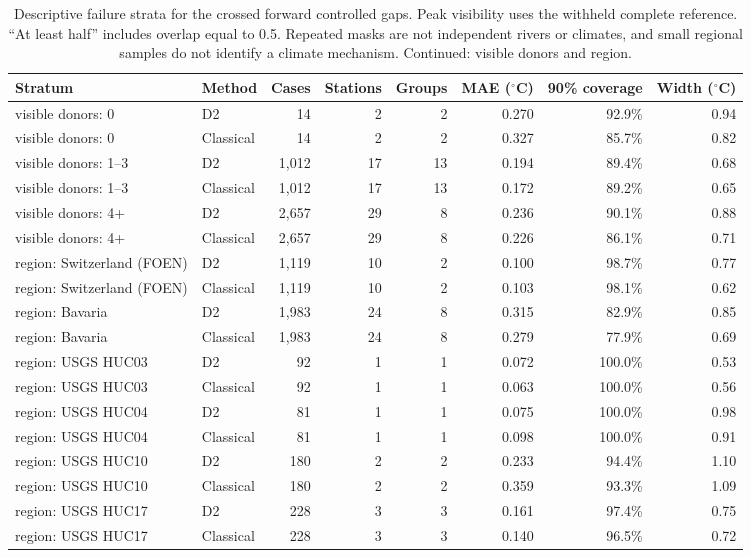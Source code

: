 \begin{table}[p]
\centering
\scriptsize
\setlength{\tabcolsep}{3pt}
\renewcommand{\arraystretch}{0.96}
\caption{Descriptive failure strata for the crossed forward controlled gaps. Peak visibility uses the withheld complete reference. ``At least half'' includes overlap equal to 0.5. Repeated masks are not independent rivers or climates, and small regional samples do not identify a climate mechanism. Continued: visible donors and region.}
\label{tab:failure-strata-region}
\begin{tabular}{@{}llrrrrrr@{}}
\toprule
Stratum & Method & Cases & Stations & Groups & MAE ($^{\circ}$C) & 90\% coverage & Width ($^{\circ}$C) \\
\midrule
visible donors: 0 & D2 & 14 & 2 & 2 & 0.270 & 92.9\% & 0.94 \\
visible donors: 0 & Classical & 14 & 2 & 2 & 0.327 & 85.7\% & 0.82 \\
visible donors: 1--3 & D2 & 1,012 & 17 & 13 & 0.194 & 89.4\% & 0.68 \\
visible donors: 1--3 & Classical & 1,012 & 17 & 13 & 0.172 & 89.2\% & 0.65 \\
visible donors: 4+ & D2 & 2,657 & 29 & 8 & 0.236 & 90.1\% & 0.88 \\
visible donors: 4+ & Classical & 2,657 & 29 & 8 & 0.226 & 86.1\% & 0.71 \\
region: Switzerland (FOEN) & D2 & 1,119 & 10 & 2 & 0.100 & 98.7\% & 0.77 \\
region: Switzerland (FOEN) & Classical & 1,119 & 10 & 2 & 0.103 & 98.1\% & 0.62 \\
region: Bavaria & D2 & 1,983 & 24 & 8 & 0.315 & 82.9\% & 0.85 \\
region: Bavaria & Classical & 1,983 & 24 & 8 & 0.279 & 77.9\% & 0.69 \\
region: USGS HUC03 & D2 & 92 & 1 & 1 & 0.072 & 100.0\% & 0.53 \\
region: USGS HUC03 & Classical & 92 & 1 & 1 & 0.063 & 100.0\% & 0.56 \\
region: USGS HUC04 & D2 & 81 & 1 & 1 & 0.075 & 100.0\% & 0.98 \\
region: USGS HUC04 & Classical & 81 & 1 & 1 & 0.098 & 100.0\% & 0.91 \\
region: USGS HUC10 & D2 & 180 & 2 & 2 & 0.233 & 94.4\% & 1.10 \\
region: USGS HUC10 & Classical & 180 & 2 & 2 & 0.359 & 93.3\% & 1.09 \\
region: USGS HUC17 & D2 & 228 & 3 & 3 & 0.161 & 97.4\% & 0.75 \\
region: USGS HUC17 & Classical & 228 & 3 & 3 & 0.140 & 96.5\% & 0.72 \\
\bottomrule
\end{tabular}
\end{table}
